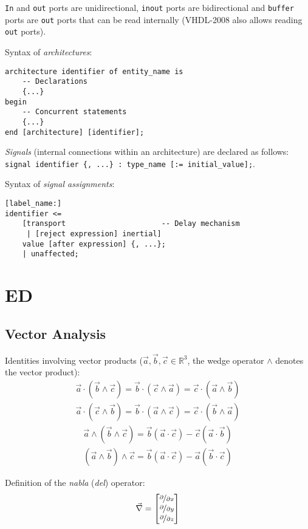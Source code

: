 \documentclass[fontsize=11pt,a4paper]{scrartcl}
\begin{document}
\lstinline!In! and \lstinline!out! ports are unidirectional, \lstinline!inout! ports are bidirectional and \lstinline!buffer! ports are \lstinline!out! ports that can be read internally (VHDL-2008 also allows reading \lstinline!out! ports).

Syntax of \emph{architectures}:
\begin{lstlisting}
architecture identifier of entity_name is
	-- Declarations
	{...}
begin
	-- Concurrent statements
	{...}
end [architecture] [identifier];
\end{lstlisting}

\emph{Signals} (internal connections within an architecture) are declared as follows:\\ \lstinline!signal identifier {, ...} : type_name [:= initial_value];!.

Syntax of \emph{signal assignments}:
\begin{lstlisting}
[label_name:]
identifier <=
	[transport                      -- Delay mechanism
	 | [reject expression] inertial]
	value [after expression] {, ...};
	| unaffected;
\end{lstlisting}
%
%
%
%
\section{ED}
\subsection{Vector Analysis}
Identities involving vector products ($\vec a, \vec b, \vec c\in\mathbb{R}^3$, the wedge operator $\wedge$ denotes the vector product):
\begin{gather*}
	\vec a\cdot(\vec b\wedge\vec c) = \vec b\cdot(\vec c\wedge\vec a) = \vec c\cdot(\vec a\wedge\vec b)\\
	\vec a\cdot(\vec c\wedge\vec b) = \vec b\cdot(\vec a\wedge\vec c) = \vec c\cdot(\vec b\wedge\vec a)
\end{gather*}
\begin{gather*}
	\vec a\wedge(\vec b\wedge\vec c) = \vec b(\vec a\cdot\vec c) - \vec c(\vec a\cdot\vec b)\\
	(\vec a\wedge\vec b)\wedge\vec c = \vec b(\vec a\cdot\vec c) - \vec a(\vec b\cdot\vec c)
\end{gather*}

Definition of the \emph{nabla} (\emph{del}) operator:
\[
	\vec\nabla = \begin{bmatrix}\nicefrac{\partial}{\partial x}\\
	                            \nicefrac{\partial}{\partial y}\\
	                            \nicefrac{\partial}{\partial z}
	             \end{bmatrix}
\]
\end{document}
